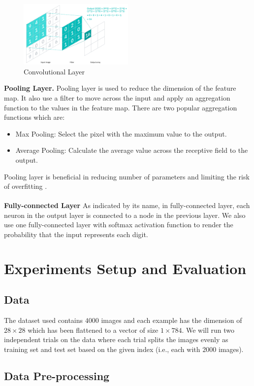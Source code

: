\documentclass{article}
\begin{document}
\begin{figure}[h]
    \centering
    \includegraphics[width=0.5\textwidth]{figure/Convolve.png}
    \caption{Convolutional Layer}
    \label{CL}
\end{figure}
\textbf{Pooling Layer. }
Pooling layer is used to reduce the dimension of the feature map. It also use a filter to move across the input and apply an aggregation function to the values in the feature map. There are two popular aggregation functions which are: 
\begin{itemize}
    \item {Max Pooling}: Select the pixel with the maximum value to the output.
    \item {Average Pooling}: Calculate the average value across the receptive field to the output.
\end{itemize}
Pooling layer is beneficial in reducing number of parameters and limiting the risk of overfitting \cite{ibmconv}.
\\ \\ 
\textbf{Fully-connected Layer}
As indicated by its name, in fully-connected layer, each neuron in the output layer is connected to a node in the previous layer. We also use one fully-connected layer with softmax activation function to render the probability that the input represents each digit.

\section{Experiments Setup and Evaluation}
\subsection{Data}
The dataset used contains $4000$ images and each example has the dimension of $28 \times 28$ which has been flattened to a vector of size $1 \times 784$. We will run two independent trials on the data where each trial splits the images evenly as training set and test set based on the given index (i.e., each with $2000$ images).
\subsection{Data Pre-processing} \label{aug}
\end{document}
